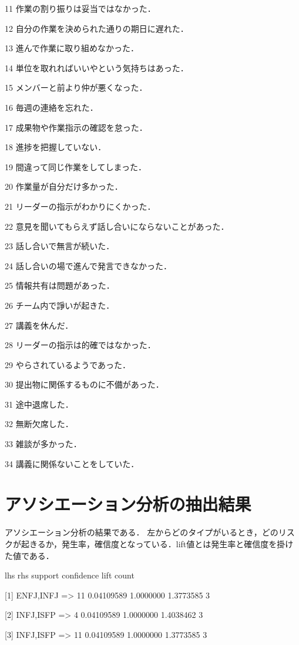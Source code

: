 11	作業の割り振りは妥当ではなかった．

12	自分の作業を決められた通りの期日に遅れた．

13	進んで作業に取り組めなかった．

14	単位を取れればいいやという気持ちはあった．

15	メンバーと前より仲が悪くなった．

16	毎週の連絡を忘れた．

17	成果物や作業指示の確認を怠った．

18	進捗を把握していない．

19	間違って同じ作業をしてしまった．

20	作業量が自分だけ多かった．

21	リーダーの指示がわかりにくかった．

22	意見を聞いてもらえず話し合いにならないことがあった．

23	話し合いで無言が続いた．

24	話し合いの場で進んで発言できなかった．

25	情報共有は問題があった．

26	チーム内で諍いが起きた．

27	講義を休んだ．

28	リーダーの指示は的確ではなかった．

29	やらされているようであった．

30	提出物に関係するものに不備があった．

31	途中退席した．

32	無断欠席した．

33	雑談が多かった．

34	講義に関係ないことをしていた．

\section{アソシエーション分析の抽出結果}
アソシエーション分析の結果である．
左からどのタイプがいるとき，どのリスクが起きるか，発生率，確信度となっている．lift値とは発生率と確信度を掛けた値である．

      lhs                      rhs  support    confidence lift      count


[1]   {ENFJ,INFJ}           => {11} 0.04109589 1.0000000  1.3773585  3   

[2]   {INFJ,ISFP}           => {4}  0.04109589 1.0000000  1.4038462  3   

[3]   {INFJ,ISFP}           => {11} 0.04109589 1.0000000  1.3773585  3   

